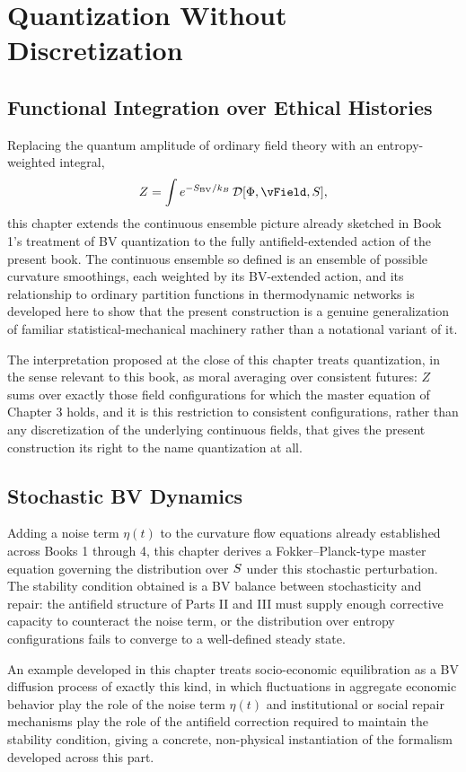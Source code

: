 \part{Quantization Without Discretization}

\chapter{Functional Integration over Ethical Histories}

Replacing the quantum amplitude of ordinary field theory with an entropy-weighted integral,
\[
Z = \int e^{-S_{\text{BV}}/k_B} \, \mathcal{D}[\PhiField, \vField, \SEntropy],
\]
this chapter extends the continuous ensemble picture already sketched in Book 1's treatment of BV quantization to the fully antifield-extended action of the present book. The continuous ensemble so defined is an ensemble of possible curvature smoothings, each weighted by its BV-extended action, and its relationship to ordinary partition functions in thermodynamic networks is developed here to show that the present construction is a genuine generalization of familiar statistical-mechanical machinery rather than a notational variant of it.

The interpretation proposed at the close of this chapter treats quantization, in the sense relevant to this book, as moral averaging over consistent futures: $Z$ sums over exactly those field configurations for which the master equation of Chapter 3 holds, and it is this restriction to consistent configurations, rather than any discretization of the underlying continuous fields, that gives the present construction its right to the name quantization at all.

\chapter{Stochastic BV Dynamics}

Adding a noise term $\eta(t)$ to the curvature flow equations already established across Books 1 through 4, this chapter derives a Fokker--Planck-type master equation governing the distribution over $S$ under this stochastic perturbation. The stability condition obtained is a BV balance between stochasticity and repair: the antifield structure of Parts II and III must supply enough corrective capacity to counteract the noise term, or the distribution over entropy configurations fails to converge to a well-defined steady state.

An example developed in this chapter treats socio-economic equilibration as a BV diffusion process of exactly this kind, in which fluctuations in aggregate economic behavior play the role of the noise term $\eta(t)$ and institutional or social repair mechanisms play the role of the antifield correction required to maintain the stability condition, giving a concrete, non-physical instantiation of the formalism developed across this part.

